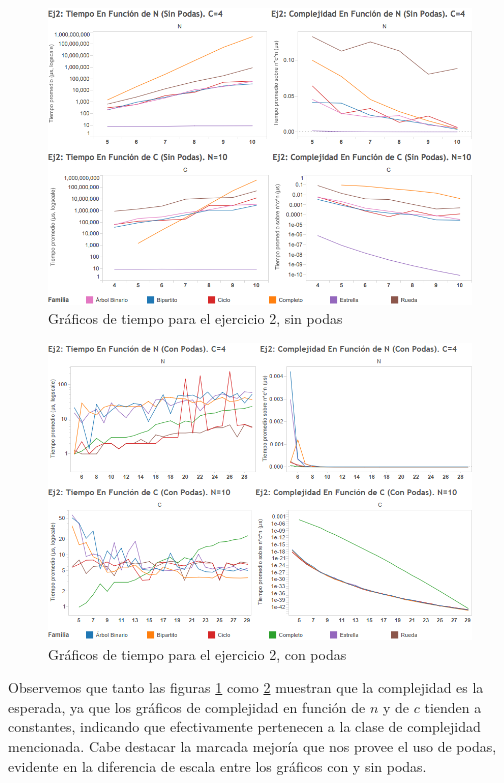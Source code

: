 \documentclass{article}
\theoremstyle{definition}
\theoremstyle{remark}
\begin{document}
\begin{figure}
\centering
\includegraphics[width=15cm]{grf/TmpEj2}
\caption{Gráficos de tiempo para el ejercicio 2, sin podas}
\label{ex2:time}
\end{figure}
\begin{figure}
\centering
\includegraphics[width=15cm]{grf/TmpEj2Podas}
\caption{Gráficos de tiempo para el ejercicio 2, con podas}
\label{ex2:timepoda}
\end{figure}

Observemos que tanto las figuras \ref{ex2:time} como \ref{ex2:timepoda} muestran que la complejidad es la esperada, ya que los gráficos de complejidad en función de $n$ y de $c$ tienden a constantes, indicando que efectivamente pertenecen a la clase de complejidad mencionada. Cabe destacar la marcada mejoría que nos provee el uso de podas, evidente en la diferencia de escala entre los gráficos con y sin podas. 
\end{document}
